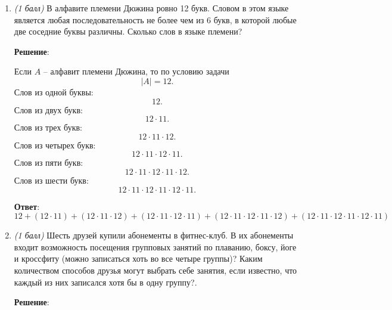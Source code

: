 \documentclass{article}
\begin{document}
    \begin{enumerate}
        \item \textit{(1 балл)} В алфавите племени Дюжина ровно 12 букв. Словом в этом языке является любая последовательность не более чем из 6 букв, в которой любые две соседние буквы различны. Сколько слов в языке племени?
        
        \textbf{Решение}:

        Если $A$ -- алфавит племени Дюжина, то по условию задачи
        \begin{equation}
            |A| = 12.            
        \end{equation}
        Слов из одной буквы:
        \begin{equation}
            12.
        \end{equation}
        Слов из двух букв:
        \begin{equation}
            12\cdot 11.
        \end{equation}
        Слов из трех букв:
        \begin{equation}
            12\cdot 11\cdot 12.
        \end{equation}
        Слов из четырех букв:
        \begin{equation}
            12\cdot 11\cdot 12\cdot 11.
        \end{equation}
        Слов из пяти букв:
        \begin{equation}
            12\cdot 11\cdot 12\cdot 11\cdot 12.
        \end{equation}
        Слов из шести букв:
        \begin{equation}
            12\cdot 11\cdot 12\cdot 11\cdot 12\cdot 11.
        \end{equation}

        \textbf{Ответ}:
        $$12 + (12\cdot11) + (12\cdot11\cdot12) + (12\cdot11\cdot12\cdot11) + (12\cdot 11\cdot 12\cdot 11\cdot 12) + (12\cdot 11\cdot 12\cdot 11\cdot 12\cdot 11)$$


        \item \textit{(1 балл)} Шесть друзей купили абонементы в фитнес-клуб. В их абонементы входит возможность посещения групповых занятий по плаванию, боксу, йоге и кроссфиту (можно записаться хоть во все четыре группы)? Каким количеством способов друзья могут выбрать себе занятия, если известно, что каждый из них записался хотя бы в одну группу?.
        
        \textbf{Решение}:


\end{enumerate}
\end{document}

